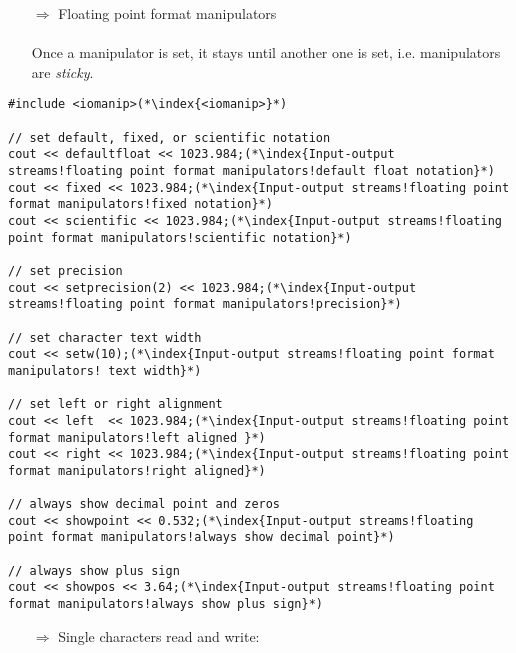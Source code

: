 \documentclass[10pt]{article}
\begin{document}
\begin{enumerate}
\item[$\Rightarrow$] Floating point format manipulators\\ \\ Once a  manipulator is set, it stays until another one is set, i.e. manipulators are \emph{sticky}.
\end{enumerate}
\begin{lstlisting}
#include <iomanip>(*\index{<iomanip>}*)

// set default, fixed, or scientific notation
cout << defaultfloat << 1023.984;(*\index{Input-output streams!floating point format manipulators!default float notation}*)
cout << fixed << 1023.984;(*\index{Input-output streams!floating point format manipulators!fixed notation}*)
cout << scientific << 1023.984;(*\index{Input-output streams!floating point format manipulators!scientific notation}*)

// set precision
cout << setprecision(2) << 1023.984;(*\index{Input-output streams!floating point format manipulators!precision}*)

// set character text width
cout << setw(10);(*\index{Input-output streams!floating point format manipulators! text width}*)

// set left or right alignment
cout << left  << 1023.984;(*\index{Input-output streams!floating point format manipulators!left aligned }*)
cout << right << 1023.984;(*\index{Input-output streams!floating point format manipulators!right aligned}*)

// always show decimal point and zeros
cout << showpoint << 0.532;(*\index{Input-output streams!floating point format manipulators!always show decimal point}*)

// always show plus sign
cout << showpos << 3.64;(*\index{Input-output streams!floating point format manipulators!always show plus sign}*)
\end{lstlisting}
\begin{enumerate}
\item[$\Rightarrow$] Single characters read and write:
\end{enumerate}
\end{document}
